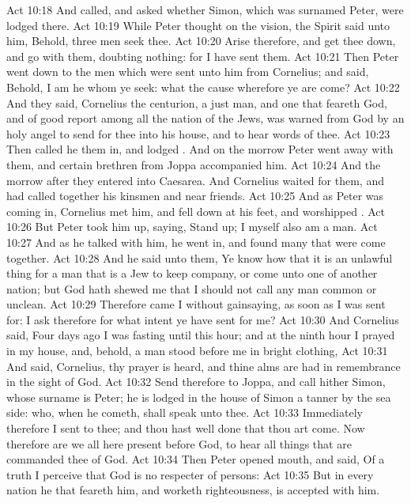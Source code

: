 \vs Act 10:18 And called, and asked whether Simon, which was surnamed Peter, were lodged there.
\vs Act 10:19 While Peter thought on the vision, the Spirit said unto him, Behold, three men seek thee.
\vs Act 10:20 Arise therefore, and get thee down, and go with them, doubting nothing: for I have sent them.
\vs Act 10:21 Then Peter went down to the men which were sent unto him from Cornelius; and said, Behold, I am he whom ye seek: what  the cause wherefore ye are come?
\vs Act 10:22 And they said, Cornelius the centurion, a just man, and one that feareth God, and of good report among all the nation of the Jews, was warned from God by an holy angel to send for thee into his house, and to hear words of thee.
\vs Act 10:23 Then called he them in, and lodged . And on the morrow Peter went away with them, and certain brethren from Joppa accompanied him.
\vs Act 10:24 And the morrow after they entered into Caesarea. And Cornelius waited for them, and had called together his kinsmen and near friends.
\vs Act 10:25 And as Peter was coming in, Cornelius met him, and fell down at his feet, and worshipped .
\vs Act 10:26 But Peter took him up, saying, Stand up; I myself also am a man.
\vs Act 10:27 And as he talked with him, he went in, and found many that were come together.
\vs Act 10:28 And he said unto them, Ye know how that it is an unlawful thing for a man that is a Jew to keep company, or come unto one of another nation; but God hath shewed me that I should not call any man common or unclean.
\vs Act 10:29 Therefore came I  without gainsaying, as soon as I was sent for: I ask therefore for what intent ye have sent for me?
\vs Act 10:30 And Cornelius said, Four days ago I was fasting until this hour; and at the ninth hour I prayed in my house, and, behold, a man stood before me in bright clothing,
\vs Act 10:31 And said, Cornelius, thy prayer is heard, and thine alms are had in remembrance in the sight of God.
\vs Act 10:32 Send therefore to Joppa, and call hither Simon, whose surname is Peter; he is lodged in the house of  Simon a tanner by the sea side: who, when he cometh, shall speak unto thee.
\vs Act 10:33 Immediately therefore I sent to thee; and thou hast well done that thou art come. Now therefore are we all here present before God, to hear all things that are commanded thee of God.
\vs Act 10:34 Then Peter opened  mouth, and said, Of a truth I perceive that God is no respecter of persons:
\vs Act 10:35 But in every nation he that feareth him, and worketh righteousness, is accepted with him.
